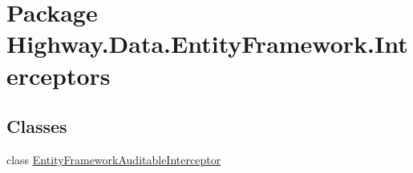 \hypertarget{namespace_highway_1_1_data_1_1_entity_framework_1_1_interceptors}{\section{Package Highway.\-Data.\-Entity\-Framework.\-Interceptors}
\label{namespace_highway_1_1_data_1_1_entity_framework_1_1_interceptors}
}
\subsection*{Classes}
\begin{DoxyCompactItemize}
\item 
class \hyperlink{class_highway_1_1_data_1_1_entity_framework_1_1_interceptors_1_1_entity_framework_auditable_interceptor}{Entity\-Framework\-Auditable\-Interceptor}
\end{DoxyCompactItemize}
